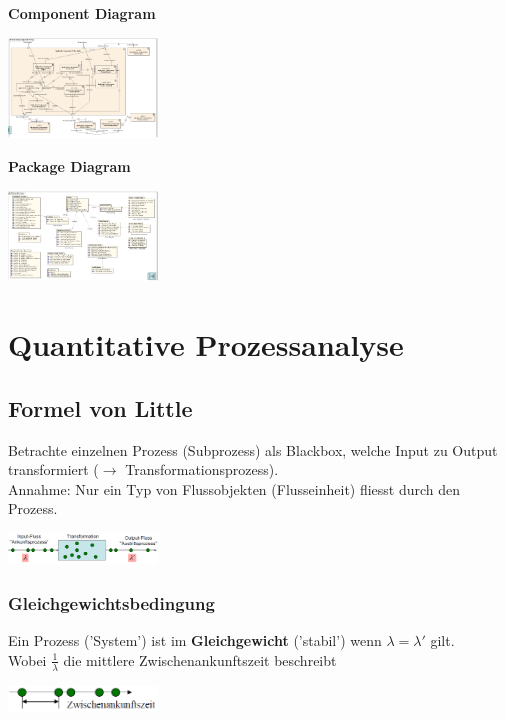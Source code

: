 \documentclass{report}
\newenvironment{Figure}
	{\par\medskip\noindent\minipage{\linewidth}}
	{\endminipage\par\medskip}
\theoremstyle{definition}
\theoremstyle{example}
\begin{document}
\textbf{Component Diagram}
\begin{Figure}
\centering
\includegraphics[width=150px]{img/ComponentDiagram.png}
	\label{fig:Beispiel eines Component Diagram nach UML}
\end{Figure}

\textbf{Package Diagram}
\begin{Figure}
\centering
\includegraphics[width=150px]{img/PackageDiagram.png}
	\label{fig:Beispiel eines Package Diagram nach UML}
\end{Figure}

\section{Quantitative Prozessanalyse}

   \subsection{Formel von Little}
Betrachte einzelnen Prozess (Subprozess) als Blackbox, welche Input zu Output transformiert ($\rightarrow$ Transformationsprozess).\\
Annahme: Nur ein Typ von Flussobjekten (Flusseinheit) fliesst durch den Prozess.
\begin{Figure}
\centering
\includegraphics[width=150px]{img/BlackboxVonLittle.png}
	\label{fig:Abbildung des Flusses nach Little}
\end{Figure}

      \subsubsection{Gleichgewichtsbedingung}
Ein Prozess ('System') ist im \textbf{Gleichgewicht} ('stabil') wenn $\lambda = \lambda'$ gilt.\\
Wobei $\frac{1}{\lambda}$ die mittlere Zwischenankunftszeit beschreibt
\begin{Figure}
\centering
\includegraphics[width=150px]{img/Zwischenankunftszeit.png}
	\label{fig:Abbildung der Zwischenankunftszeit}
\end{Figure}
\end{document}

